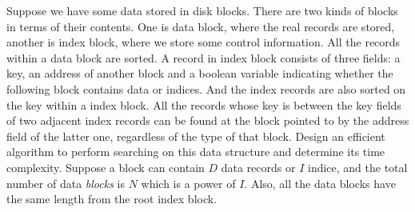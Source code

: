Suppose we have some data stored in disk blocks. There are two kinds of
blocks in terms of their contents. One is data block, where the real
records are stored, another is index block, where we store some control
information. All the records within a data block are sorted. A record 
in index block consists of three fields: a key, an address of another
block and a boolean variable indicating whether the following block
contains data or indices. And the index records are also sorted on
the key within a index block. All the records whose key is between 
the key fields of two adjacent index records can be found at the block
pointed to by the address field of the latter one, regardless of the
type of that block. Design an efficient
algorithm to perform searching on this data structure and determine 
its time complexity. Suppose a block can contain $D$ data records 
or $I$ indice, and the total number of data {\em blocks} is $N$ which is
a power of $I$. Also, all the data blocks have the same length from
the root index block.
